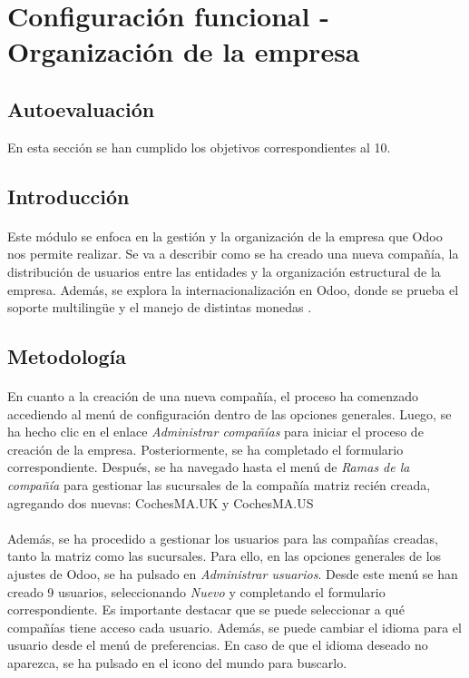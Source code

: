 \section{Configuración funcional - Organización de la empresa}
\subsection{Autoevaluación}
En esta sección se han cumplido los objetivos correspondientes al 10.
\subsection{Introducción}
\paragraph{}
Este módulo se enfoca en la gestión y la organización de la empresa que Odoo nos permite realizar. Se va a describir como se ha creado una nueva compañía, la distribución de usuarios entre las entidades y la organización estructural de la empresa. Además, se explora la internacionalización en Odoo, donde se prueba el soporte multilingüe y el manejo de distintas monedas .
\subsection{Metodología}
\paragraph{}
En cuanto a la creación de una nueva compañía, el proceso ha comenzado accediendo al menú de configuración dentro de las opciones generales. Luego, se ha hecho clic en el enlace \textit{Administrar compañías} para iniciar el proceso de creación de la empresa. Posteriormente, se ha completado el formulario correspondiente. Después, se ha navegado hasta el menú de \textit{Ramas de la compañía} para gestionar las sucursales de la compañía matriz recién creada, agregando dos nuevas: CochesMA.UK y CochesMA.US
\paragraph{}
Además, se ha procedido a gestionar los usuarios para las compañías creadas, tanto la matriz como las sucursales. Para ello, en las opciones generales de los ajustes de Odoo, se ha pulsado en \textit{Administrar usuarios}. Desde este menú se han creado 9 usuarios, seleccionando \textit{Nuevo} y completando el formulario correspondiente. Es importante destacar que se puede seleccionar a qué compañías tiene acceso cada usuario. Además, se puede cambiar el idioma para el usuario desde el menú de preferencias. En caso de que el idioma deseado no aparezca, se ha pulsado en el icono del mundo para buscarlo.
